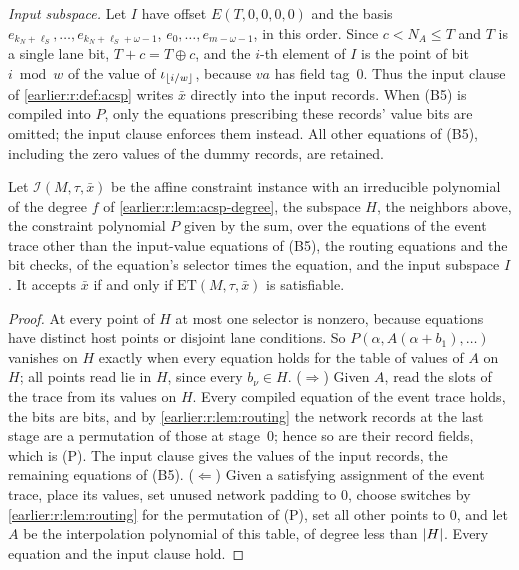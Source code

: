 \emph{Input subspace.} Let \(I\) have offset \(E(T,0,0,0,0)\) and the basis
\(e_{k_N+\ell_S},\ldots,e_{k_N+\ell_S+\omega-1}\),
\(e_0,\ldots,e_{m-\omega-1}\), in this order. Since \(c<N_A\le T\) and \(T\) is a single lane bit,
\(T+c=T\oplus c\), and the \(i\)-th element of \(I\) is the point of
bit \(i\bmod w\) of the value of \(\iota_{\left\lfloor i/w\right\rfloor}\), because
\(\mathit{va}\) has field tag~\(0\). Thus the input clause of
\cref{earlier:r:def:acsp} writes \(\bar x\) directly into the input records. When
(B5) is compiled into \(P\), only the equations prescribing these
records' value bits are omitted; the input clause enforces them
instead. All other equations of (B5), including the zero values of the
dummy records, are retained.

\begin{theorem}\label{earlier:r:thm:embedding}
Let \(\mathcal I(M,\tau,\bar x)\) be the affine constraint instance with
an irreducible polynomial of the degree \(f\) of \cref{earlier:r:lem:acsp-degree},
the subspace \(H\), the neighbors
above, the constraint polynomial \(P\) given by the sum, over the
equations of the event trace other than the input-value equations of
(B5), the routing equations and the bit checks, of the equation's
selector times the equation, and the input subspace
\(I\). It accepts \(\bar x\) if and only if
\(\mathrm{ET}(M,\tau,\bar x)\) is satisfiable.
\end{theorem}
\begin{proof}
At every point of \(H\) at most one selector is nonzero, because
equations have distinct host points or disjoint lane conditions. So
\(P(\alpha,A(\alpha+b_1),\ldots)\) vanishes on \(H\) exactly when every
equation holds for the table of values of \(A\) on \(H\); all points read
lie in \(H\), since every \(b_\nu\in H\). (\(\Rightarrow\)) Given \(A\),
read the slots of the trace from its values on \(H\). Every compiled
equation of the event trace holds, the bits are bits, and by \cref{earlier:r:lem:routing}
the network records at the last stage are a permutation of those at
stage~\(0\); hence so are their record fields, which is (P). The input
clause gives the values of the input records, the remaining equations
of (B5). (\(\Leftarrow\)) Given a
satisfying assignment of the event trace, place its values, set unused
network padding to \(0\), choose switches by \cref{earlier:r:lem:routing} for the
permutation of (P), set all other points to \(0\), and let \(A\) be the
interpolation polynomial of this table, of degree less than
\(\left|H\right|\). Every equation and the input clause hold.
\end{proof}

